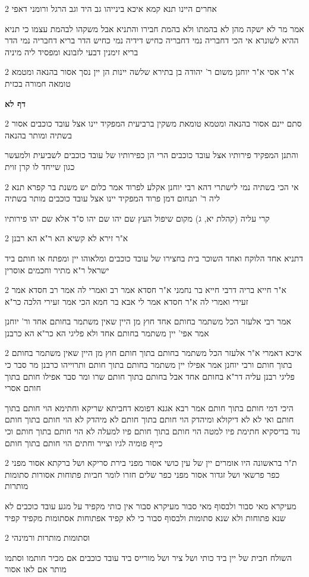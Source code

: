 \documentclass[12pt, openany]{book}
\newcommand{\sethebfont}{
\fontsize{10.5pt}{21.0pt} \selectfont
}
\newcommand{\twocol}[1]{
	{\sethebfont \begin{multicols}{2}
			#1
	\end{multicols}}	
}
\newcommand{\sectname}{}
\newcommand{\newsection}[1]{
	\addcontentsline{toc}{section}{#1}
	\renewcommand{\sectname}{#1}	
	\vspace{-\baselineskip}
	\begin{center}
		\textbf{%
\fontsize{16pt}{16pt}\selectfont
			#1}
	\end{center}
	\vspace{-\baselineskip}
	\nopagebreak
}
\begin{document}
\twocol{אחרים היינו תנא קמא איכא בינייהו גב היד וגב הרגל ורומני דאפי
\par אמר מר לא ישקה מהן לא בהמתו ולא בהמת חבירו והתניא אבל משקהו לבהמת עצמו כי תניא ההיא לשונרא אי הכי דחבריה נמי דחבריה כחיש דידיה נמי כחיש הדר בריא דחבריה נמי הדר בריא זימנין דבעי לזבונא ומפסיד ליה מיניה}
\twocol{א"ר אסי א"ר יוחנן משום ר' יהודה בן בתירא שלשה יינות הן יין נסך אסור בהנאה ומטמא טומאה חמורה בכזית}
\newsection{דף לא}
\twocol{סתם יינם אסור בהנאה ומטמא טומאת משקין ברביעית המפקיד יינו אצל עובד כוכבים אסור בשתיה ומותר בהנאה
\par והתנן המפקיד פירותיו אצל עובד כוכבים הרי הן כפירותיו של עובד כוכבים לשביעית ולמעשר כגון שייחד לו קרן זוית}
\twocol{אי הכי בשתיה נמי לישתרי דהא רבי יוחנן אקלע לפרוד אמר כלום יש משנת בר קפרא תנא ליה ר' תנחום דמן פרוד המפקיד יינו אצל עובד כוכבים מותר בשתיה
\par קרי עליה (קהלת יא, ג) מקום שיפול העץ שם יהו שם יהו ס"ד אלא שם יהו פירותיו}
\twocol{א"ר זירא לא קשיא הא ר"א הא רבנן
\par דתניא אחד הלוקח ואחד השוכר בית בחצירו של עובד כוכבים ומלאוהו יין ומפתח או חותם ביד ישראל ר"א מתיר וחכמים אוסרין}
\twocol{א"ר חייא בריה דרבי חייא בר נחמני א"ר חסדא אמר רב ואמרי לה אמר רב חסדא אמר זעירי ואמרי לה א"ר חסדא אמר לי אבא בר חמא הכי אמר זעירי הלכה כר"א
\par אמר רבי אלעזר הכל משתמר בחותם אחד חוץ מן היין שאין משתמר בחותם אחד ור' יוחנן אמר אפי' יין משתמר בחותם אחד ולא פליגי הא כר"א הא כרבנן}
\twocol{איכא דאמרי א"ר אלעזר הכל משתמר בחותם בתוך חותם חוץ מן היין שאין משתמר בחותם בתוך חותם ורבי יוחנן אמר אפילו יין משתמר בחותם בתוך חותם ותרוייהו כרבנן מר סבר כי פליגי רבנן עליה דר"א בחותם אחד אבל בחותם בתוך חותם שרו ומר סבר אפילו חותם בתוך חותם אסרי
\par היכי דמי חותם בתוך חותם אמר רבא אגנא דפומא דחביתא שריקא וחתימא הוי חותם בתוך חותם ואי לא לא דיקולא ומיהדק הוי חותם בתוך חותם לא מיהדק לא הוי חותם בתוך חותם נוד בדיסקיא חתימת פיו למטה הוי חותם בתוך חותם פיו למעלה לא הוי חותם בתוך חותם וכי כייף פומיה לגיו וצייר וחתים הוי חותם בתוך חותם}
\twocol{ת"ר בראשונה היו אומרים יין של עין כושי אסור מפני בירת סריקא ושל ברקתא אסור מפני כפר פרשאי ושל זגדור אסור מפני כפר שלים חזרו לומר חביות פתוחות אסורות סתומות מותרות
\par מעיקרא מאי סבור ולבסוף מאי סבור מעיקרא סבור אין כותי מקפיד על מגע עובד כוכבים לא שנא פתוחות ולא שנא סתומות ולבסוף סבור כי לא קפיד אפתוחות אסתומות מקפיד קפיד}
\twocol{וסתומות מותרות ורמינהי
\par השולח חבית של יין ביד כותי ושל ציר ושל מורייס ביד עובד כוכבים אם מכיר חותמו וסתמו מותר אם לאו אסור}
\end{document}
